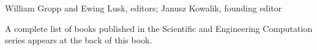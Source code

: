 % 

%
{William Gropp and Ewing Lusk, editors;
Janusz Kowalik, founding editor}

\vskip35pt

{\noindent A complete list of books published in the Scientific and 
Engineering Computation series appears at the back of this book.}


